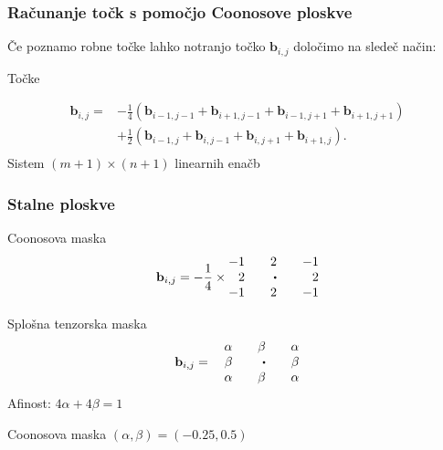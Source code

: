 \documentclass{beamer}
\newcommand\sbullet[1][.5]{\mathbin{\vcenter{\hbox{\scalebox{#1}{$\bullet$}}}}}
\begin{document}
\begin{frame}
\frametitle{Računanje točk s pomočjo Coonosove ploskve}
Če poznamo robne točke lahko notranjo točko $\mathbf{b}_{i,j}$ določimo na sledeč način: 
\begin{block}{Točke}

    \begin{align*}
        \mathbf{b}_{i,j} =& -\frac{1}{4}(\mathbf{b}_{i-1,j-1} + \mathbf{b}_{i+1,j-1} +
           \mathbf{b}_{i-1,j+1} + \mathbf{b}_{i+1,j+1}) \\
           &+\frac{1}{2}(\mathbf{b}_{i-1,j} + \mathbf{b}_{i,j-1}+
           \mathbf{b}_{i,j+1} + \mathbf{b}_{i+1,j}).\\
     \end{align*}
     Sistem $(m+1)\times(n+1)$ linearnih enačb
\end{block}
\end{frame}

\begin{frame}
\frametitle{Stalne ploskve}
\begin{block}{Coonosova maska}
    $$
    \mathbf{b}_{i,j} = -\frac{1}{4} \times 
    \begin{matrix*}[r]
    -1 && 2 && -1 \\
    2 && \sbullet && 2\\
    -1 && 2 && -1
    \end{matrix*}
    $$
\end{block}

\begin{block}{Splošna tenzorska maska}
    $$
    \mathbf{b}_{i,j} =  \quad 
    \begin{matrix*}[r]
    \alpha && \beta && \alpha \\
    \beta && \sbullet && \beta \\
    \alpha && \beta && \alpha
    \end{matrix*}
    $$
    Afinost: $4\alpha + 4\beta = 1$
\end{block}

\begin{block}{Coonosova maska}
    $(\alpha, \beta) = (-0.25, 0.5)$
\end{block}
\end{frame}
\end{document}
